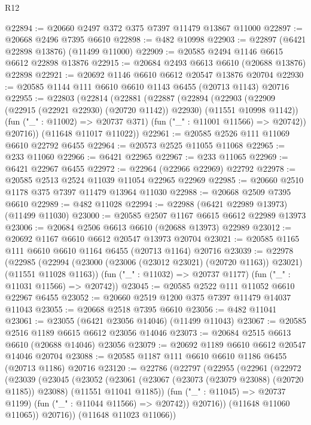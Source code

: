 \begin{lexlean}{R12}
\begin{coremodule}
{{{{{{{{{{{{{{{{{{{{{{{{{{{{{{{{{{{{{{{{{{{{{{{{{{{{{{{{{{{{{{{{{{{{{{{{{{{{{{{{{{@22894 := @20660 @2497 @372 @375 @7397 @11479 @13867 @11000
@22897 := @20668 @2496 @7395 @6610
@22898 := @482 @10998
@22903 := @22897 (@6421 @22898 @13876) (@11499 @11000)
@22909 := @20585 @2494 @1146 @6615 @6612 @22898 @13876
@22915 := @20684 @2493 @6613 @6610 (@20688 @13876) @22898
@22921 := @20692 @1146 @6610 @6612 @20547 @13876 @20704
@22930 := @20585 @1144 @111 @6610 @6610 @1143 @6455 (@20713 @1143) @20716
@22955 := @22803
    (@22814
      (@22881
        (@22887
          (@22894
            (@22903 (@22909 (@22915 (@22921 @22930) (@20720 @1142)) @22930) (@11551 @10998 @1142))
            (fun ("_" : @11002) => @20737 @371)
            (fun ("_" : @11001 @11566) => @20742))
          @20716))
      (@11648 @11017 @11022))
@22961 := @20585 @2526 @111 @11069 @6610 @22792 @6455
@22964 := @20573 @2525 @11055 @11068
@22965 := @233 @11060
@22966 := @6421 @22965
@22967 := @233 @11065
@22969 := @6421 @22967 @6455
@22972 := @22964 (@22966 @22969) @22792
@22978 := @20585 @2513 @2524 @11039 @11054 @22965 @22969
@22985 := @20660 @2510 @1178 @375 @7397 @11479 @13964 @11030
@22988 := @20668 @2509 @7395 @6610
@22989 := @482 @11028
@22994 := @22988 (@6421 @22989 @13973) (@11499 @11030)
@23000 := @20585 @2507 @1167 @6615 @6612 @22989 @13973
@23006 := @20684 @2506 @6613 @6610 (@20688 @13973) @22989
@23012 := @20692 @1167 @6610 @6612 @20547 @13973 @20704
@23021 := @20585 @1165 @111 @6610 @6610 @1164 @6455 (@20713 @1164) @20716
@23039 := @22978
    (@22985
      (@22994 (@23000 (@23006 (@23012 @23021) (@20720 @1163)) @23021) (@11551 @11028 @1163))
      (fun ("_" : @11032) => @20737 @1177)
      (fun ("_" : @11031 @11566) => @20742))
@23045 := @20585 @2522 @111 @11052 @6610 @22967 @6455
@23052 := @20660 @2519 @1200 @375 @7397 @11479 @14037 @11043
@23055 := @20668 @2518 @7395 @6610
@23056 := @482 @11041
@23061 := @23055 (@6421 @23056 @14046) (@11499 @11043)
@23067 := @20585 @2516 @1189 @6615 @6612 @23056 @14046
@23073 := @20684 @2515 @6613 @6610 (@20688 @14046) @23056
@23079 := @20692 @1189 @6610 @6612 @20547 @14046 @20704
@23088 := @20585 @1187 @111 @6610 @6610 @1186 @6455 (@20713 @1186) @20716
@23120 := @22786
    (@22797
      (@22955
        (@22961
          (@22972
            (@23039
              (@23045
                (@23052
                  (@23061
                    (@23067 (@23073 (@23079 @23088) (@20720 @1185)) @23088)
                    (@11551 @11041 @1185))
                  (fun ("_" : @11045) => @20737 @1199)
                  (fun ("_" : @11044 @11566) => @20742))
                @20716))
            (@11648 @11060 @11065))
          @20716))
      (@11648 @11023 @11066))
}}}}}}}}}}}}}}}}}}}}}}}}}}}}}}}}}}}}}}}}}}}}}}}}}}}}}}}}}}}}}}}}}}}}}}}}}}}}}}}}}}
\end{coremodule}
\end{lexlean}
